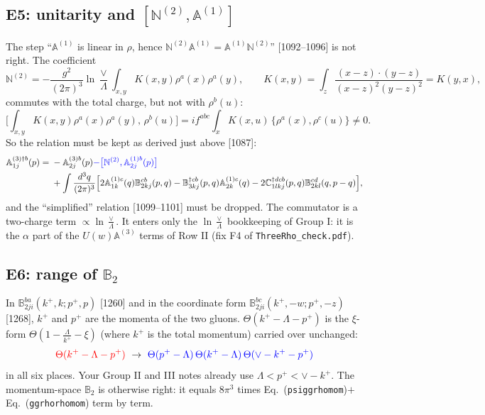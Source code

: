 \documentclass[10pt]{article}
\def\mf#1{\mathbb{#1}}
\newcommand{\old}[1]{{\color{red}#1}}
\newcommand{\new}[1]{{\color{blue}#1}}
\newcommand{\eqn}[1]{Eq.~(\texttt{#1})}
\begin{document}
\subsection{E5: unitarity and $[\mf N^{(2)},\mf A^{(1)}]$}
The step ``$\mf A^{(1)}$ is linear in $\rho$, hence $\mf N^{(2)}\mf A^{(1)}=\mf A^{(1)}\mf N^{(2)}$'' [1092--1096] is not right. The coefficient
\begin{equation}
\mf N^{(2)}=-\frac{g^2}{(2\pi)^3}\ln\frac{\vee}{\Lambda}\int_{x,y}K(x,y)\rho^a(x)\rho^a(y),\qquad K(x,y)=\int_z\frac{(x-z)\cdot(y-z)}{(x-z)^2(y-z)^2}=K(y,x),
\end{equation}
commutes with the total charge, but not with $\rho^b(u)$:
\begin{equation}
\Big[\int_{x,y}K(x,y)\rho^a(x)\rho^a(y),\,\rho^b(u)\Big]=if^{abc}\int_xK(x,u)\,\{\rho^a(x),\rho^c(u)\}\neq0 .
\end{equation}
So the relation must be kept as derived just above [1087]:
\begin{align}
\mf A^{(3)\dagger b}_{1j}(p)={}&-\mf A^{(3)b}_{2j}(p)\new{-\big[\mf N^{(2)},\mf A^{(1)b}_{2j}(p)\big]}\notag\\
&+\int\frac{d^3q}{(2\pi)^3}\Big[2\mf A^{(1)c}_{1k}(q)\mf B^{cb}_{2kj}(p,q)-\mf B^{\dagger cb}_{3kj}(p,q)\mf A^{(1)c}_{2k}(q)-2\mf C^{\dagger dcb}_{1lkj}(p,q)\mf B^{cd}_{2kl}(q,p-q)\Big],
\end{align}
and the ``simplified'' relation [1099--1101] must be dropped. The commutator is a two-charge term $\propto\ln\frac{\vee}{\Lambda}$. It enters only the $\ln\frac{\vee}{\Lambda}$ bookkeeping of Group I: it is the $\alpha$ part of the $U(w)\mf A^{(3)}$ terms of Row II (fix F4 of \texttt{ThreeRho\_check.pdf}).

\subsection{E6: range of $\mf B_2$}
In $\mf B^{ba}_{2ji}(k^+,k;p^+,p)$ [1260] and in the coordinate form $\mf B^{bc}_{2ji}(k^+,-w;p^+,-z)$ [1268], $k^+$ and $p^+$ are the momenta of the two gluons. $\Theta(k^+-\Lambda-p^+)$ is the $\xi$-form $\Theta(1-\frac{\Lambda}{k^+}-\xi)$ (where $k^+$ is the total momentum) carried over unchanged:
\begin{equation}
\old{\Theta(k^+-\Lambda-p^+)}\ \to\ \new{\Theta(p^+-\Lambda)\,\Theta(k^+-\Lambda)\,\Theta(\vee-k^+-p^+)}
\end{equation}
in all six places. Your Group II and III notes already use $\Lambda<p^+<\vee-k^+$. The momentum-space $\mf B_2$ is otherwise right: it equals $8\pi^3$ times \eqn{psiggrhomom}$+$\eqn{ggrhorhomom} term by term.
\end{document}
